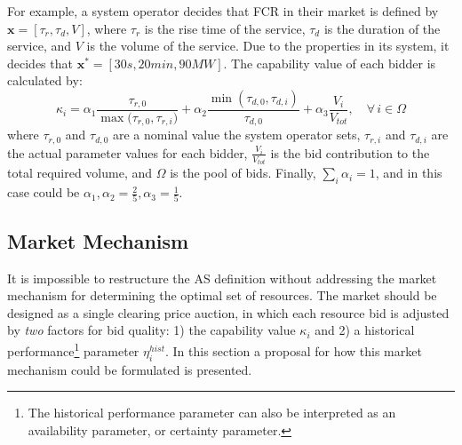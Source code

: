 For example, a system operator decides that FCR in their market is defined by $\textbf{x} = [\tau_r,\tau_d,V]$, where $\tau_r$ is the rise time of the service, $\tau_d$ is the duration of the service, and $V$ is the volume of the service. Due to the properties in its system, it decides that $\textbf{x}^* = [30 s, 20 min, 90 MW]$. The capability value of each bidder is calculated by:
\begin{equation}
	\kappa_i = \alpha_1 \frac{\tau_{r,0}}{\max({\tau_{r,0},\tau_{r,i})}} + \alpha_2  \frac{\min(\tau_{d,0},\tau_{d,i})}{\tau_{d,0}} + \alpha_3 \frac{V_i}{V_{tot}}, \quad \forall \, i \in \Omega \label{eq:kappa_primfreq}
\end{equation}
where $\tau_{r,0}$ and $\tau_{d,0}$ are a nominal value the system operator sets, $\tau_{r,i}$ and $\tau_{d,i}$ are the actual parameter values for each bidder, $\frac{V_i}{V_{tot}}$ is the bid contribution to the total required volume, and $\Omega$ is the pool of bids. Finally, $\sum_{i} \alpha_i = 1$, and in this case could be $\alpha_1,\alpha_2 = \frac{2}{5}, \alpha_3 = \frac{1}{5}$.

\subsection{Market Mechanism} %
\label{sub:MarketMechanism}
It is impossible to restructure the AS definition without addressing the market mechanism for determining the optimal set of resources. The market should be designed as a single clearing price auction, in which each resource bid is adjusted by \emph{two} factors for bid quality: 1) the capability value $\kappa_i$ and 2) a historical performance\footnote{The historical performance parameter can also be interpreted as an availability parameter, or certainty parameter.} parameter $\eta^{hist}_i$. In this section a proposal for how this market mechanism could be formulated is presented.


